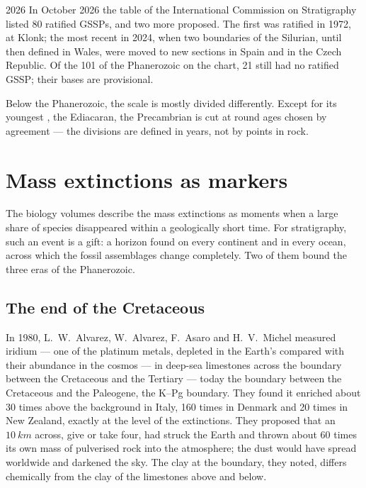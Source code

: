 \begin{dated}{2026}
In October 2026 the table of the International Commission on Stratigraphy listed
80 ratified GSSPs, and two more proposed. The first was ratified in 1972, at
Klonk; the most recent in 2024, when two boundaries of the Silurian, until then
defined in Wales, were moved to new sections in Spain and in the Czech
Republic. Of the 101  of the Phanerozoic on the chart, 21 still had no
ratified GSSP; their bases are provisional.
\end{dated}

Below the Phanerozoic, the scale is mostly divided differently. Except for its
youngest , the Ediacaran, the Precambrian is cut at round ages chosen by
agreement --- the divisions are defined in years, not by points in rock.

\section{Mass extinctions as markers}\label{sec:b1:stratigraphic-scale:extinctions}

The biology volumes describe the mass extinctions as moments when a large share of
species disappeared within a geologically short time. For stratigraphy, such an
event is a gift: a horizon found on every continent and in every ocean,
across which the fossil assemblages change completely. Two of them bound the
three eras of the Phanerozoic.

\subsection*{The end of the Cretaceous}

In 1980, L.~W.~Alvarez, W.~Alvarez, F.~Asaro and H.~V.~Michel measured iridium
--- one of the platinum metals, depleted in the Earth's  compared with
their abundance in the cosmos --- in deep-sea limestones across the boundary
between the Cretaceous and the Tertiary --- today the boundary between the
Cretaceous and the Paleogene, the K--Pg boundary. They found it enriched about 30 times above
the background in Italy, 160 times in Denmark and 20 times in New Zealand,
exactly at the level of the extinctions. They proposed that an 
$\qty{10}{km}$ across, give or take four, had struck the Earth and thrown about
60 times its own mass of pulverised rock into the atmosphere; the dust would
have spread worldwide and darkened the sky. The clay at the boundary, they
noted, differs chemically from the clay of the limestones above and below.


